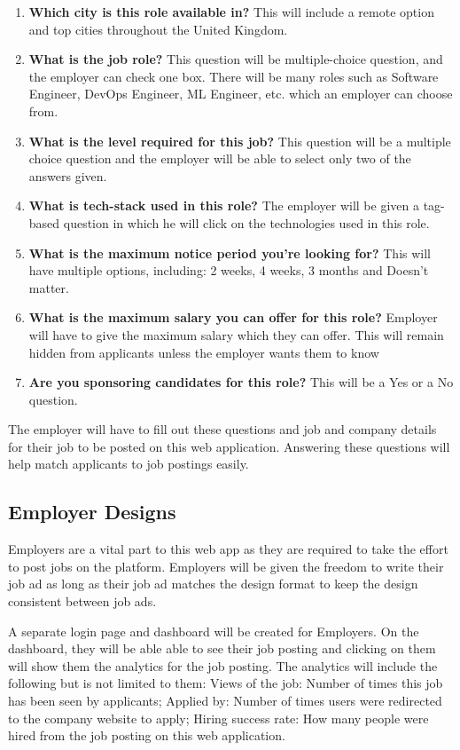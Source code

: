 \begin{enumerate}
    \item \textbf{Which city is this role available in?} This will include a remote option and top cities throughout the United Kingdom.
    \item \textbf{What is the job role?} This question will be multiple-choice question, and the employer can check one box. There will be many roles such as Software Engineer, DevOps Engineer, ML Engineer, etc. which an employer can choose from.
    \item \textbf{What is the level required for this job?} This question will be a multiple choice question and the employer will be able to select only two of the answers given.
    \item \textbf{What is tech-stack used in this role?} The employer will be given a tag-based question in which he will click on the technologies used in this role.
    \item \textbf{What is the maximum notice period you're looking for?} This will have multiple options, including: 2 weeks, 4 weeks, 3 months and Doesn't matter.
    \item \textbf{What is the maximum salary you can offer for this role?} Employer will have to give the maximum salary which they can offer. This will remain hidden from applicants unless the employer wants them to know
    \item \textbf{Are you sponsoring candidates for this role?} This will be a Yes or a No question.
\end{enumerate}

The employer will have to fill out these questions and job and company details for their job to be posted on this web application. Answering these questions will help match applicants to job postings easily.

\subsection{Employer Designs}
Employers are a vital part to this web app as they are required to take the effort to post jobs on the platform. Employers will be given the freedom to write their job ad as long as their job ad matches the design format to keep the design consistent between job ads.

A separate login page and dashboard will be created for Employers. On the dashboard, they will be able able to see their job posting and clicking on them will show them the analytics for the job posting. The analytics will include the following but is not limited to them: Views of the job: Number of times this job has been seen by applicants; Applied by: Number of times users were redirected to the company website to apply; Hiring success rate: How many people were hired from the job posting on this web application. 

